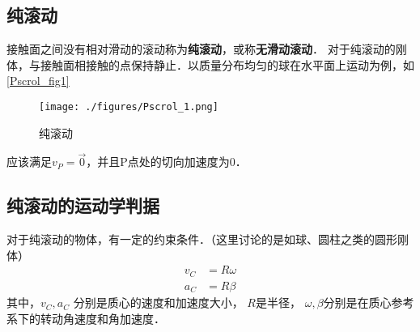 

\begin{issues}
\issueTODO
\end{issues}

\subsection{纯滚动}
接触面之间没有相对滑动的滚动称为\textbf{纯滚动}，或称\textbf{无滑动滚动}．
对于纯滚动的刚体，与接触面相接触的点保持静止．以质量分布均匀的球在水平面上运动为例，如\autoref{Pscrol_fig1}
\begin{figure}[ht]
\centering
\texttt{[image: ./figures/Pscrol\_1.png]}
\caption{纯滚动} \label{Pscrol_fig1}
\end{figure}
应该满足$v_P=\vec 0$，并且P点处的切向加速度为0．

\subsection{纯滚动的运动学判据}
对于纯滚动的物体，有一定的约束条件．（这里讨论的是如球、圆柱之类的圆形刚体）
\begin{align}
v_C&=R\omega\\
a_C&=R\beta
\end{align}
其中，$v_C,a_C$
分别是质心的速度和加速度大小，
$R$是半径，
$\omega,\beta$分别是在质心参考系下的转动角速度和角加速度．